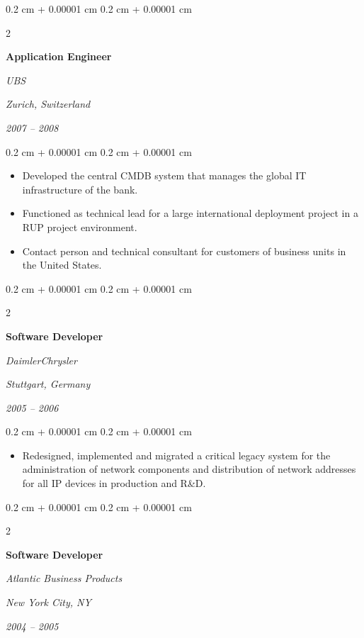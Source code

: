 \documentclass[10pt, a4paper]{article}
\newenvironment{highlights}{
    \begin{itemize}[
        topsep=0.10 cm,
        parsep=0.10 cm,
        partopsep=0pt,
        itemsep=0pt,
        leftmargin=0.4 cm + 10pt
    ]
}{
    \end{itemize}
} %
\newenvironment{onecolentry}{
    \begin{adjustwidth}{
        0.2 cm + 0.00001 cm
    }{
        0.2 cm + 0.00001 cm
    }
}{
    \end{adjustwidth}
} %
\newenvironment{twocolentry}[2][]{
    \onecolentry
    \def\secondColumn{#2}
    \setcolumnwidth{\fill, 8 cm}
    \begin{paracol}{2}
}{
    \switchcolumn \raggedleft \secondColumn
    \end{paracol}
    \endonecolentry
} %
\begin{document}
%
%
\begin{twocolentry}{
        \textit{Zurich, Switzerland}

        \textit{2007 – 2008}}
    \textbf{Application Engineer}

    \textit{UBS}
\end{twocolentry}

\vspace{0.10 cm}
\begin{onecolentry}
    \begin{highlights}
        \item Developed the central CMDB system that manages the global IT infrastructure of the bank.
        \item Functioned as technical lead for a large international deployment project in a RUP project environment.
        \item Contact person and technical consultant for customers of business units in the United States.
    \end{highlights}
\end{onecolentry}

\vspace{0.20 cm}



%
%
\begin{twocolentry}{
        \textit{Stuttgart, Germany}

        \textit{2005 – 2006}}
    \textbf{Software Developer}

    \textit{DaimlerChrysler}
\end{twocolentry}

\vspace{0.10 cm}
\begin{onecolentry}
    \begin{highlights}
        \item Redesigned, implemented and migrated a critical legacy system for the administration of network components and distribution of network addresses for all IP devices in production and R\&D.
    \end{highlights}
\end{onecolentry}

\vspace{0.20 cm}



%
%
\begin{twocolentry}{
        \textit{New York City, NY}

        \textit{2004 – 2005}}
    \textbf{Software Developer}

    \textit{Atlantic Business Products}
\end{twocolentry}
\end{document}
